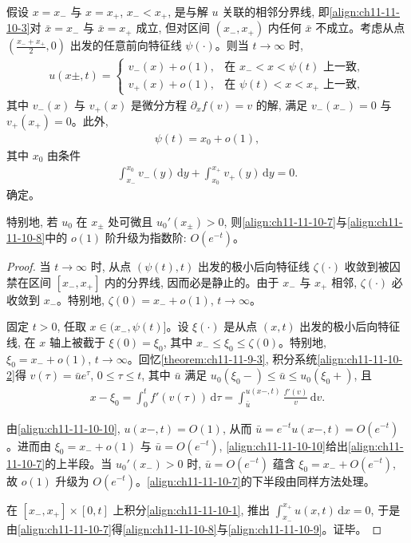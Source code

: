 \documentclass[../../main.tex]{subfiles}
\begin{document}
\begin{lemma}\label{lemma:ch11-11-10-2}
假设 $x=x_-$ 与 $x=x_+$, $x_-<x_+$, 是与解 $u$ 关联的相邻分界线, 即\eqref{align:ch11-11-10-3}对 $\bar x=x_-$ 与 $\bar x=x_+$ 成立, 但对区间 $(x_-,x_+)$ 内任何 $\bar x$ 不成立。考虑从点 $\left(\frac{x_-+x_+}{2},0\right)$ 出发的任意前向特征线 $\psi(\cdot)$。则当 $t\to\infty$ 时,
\begin{align}
u(x\pm,t)=
\begin{cases}
v_-(x)+o(1), & \text{在 }x_-<x<\psi(t)\text{ 上一致},\\
v_+(x)+o(1), & \text{在 }\psi(t)<x<x_+\text{ 上一致},
\end{cases}\label{align:ch11-11-10-7}
\end{align}
其中 $v_-(x)$ 与 $v_+(x)$ 是微分方程 $\partial_x f(v)=v$ 的解, 满足 $v_-(x_-)=0$ 与 $v_+(x_+)=0$。此外,
\begin{align}
\psi(t)=x_0+o(1),\label{align:ch11-11-10-8}
\end{align}
其中 $x_0$ 由条件
\begin{align}
\int_{x_-}^{x_0}v_-(y)\,\mathrm{d}y+\int_{x_0}^{x_+}v_+(y)\,\mathrm{d}y=0.\label{align:ch11-11-10-9}
\end{align}
确定。

特别地, 若 $u_0$ 在 $x_\pm$ 处可微且 $u_0'(x_\pm)>0$, 则\eqref{align:ch11-11-10-7}与\eqref{align:ch11-11-10-8}中的 $o(1)$ 阶升级为指数阶: $O(e^{-t})$。
\end{lemma}

\begin{proof}
当 $t\to\infty$ 时, 从点 $(\psi(t),t)$ 出发的极小后向特征线 $\zeta(\cdot)$ 收敛到被囚禁在区间 $[x_-,x_+]$ 内的分界线, 因而必是静止的。由于 $x_-$ 与 $x_+$ 相邻, $\zeta(\cdot)$ 必收敛到 $x_-$。特别地, $\zeta(0)=x_-+o(1)$, $t\to\infty$。

固定 $t>0$, 任取 $x\in(x_-,\psi(t)]$。设 $\xi(\cdot)$ 是从点 $(x,t)$ 出发的极小后向特征线, 在 $x$ 轴上被截于 $\xi(0)=\xi_0$, 其中 $x_-\leqslant\xi_0\leqslant\zeta(0)$。特别地, $\xi_0=x_-+o(1)$, $t\to\infty$。回忆\cref{theorem:ch11-11-9-3}, 积分系统\eqref{align:ch11-11-10-2}得 $v(\tau)=\bar u e^\tau$, $0\leqslant\tau\leqslant t$, 其中 $\bar u$ 满足 $u_0(\xi_0-)\leqslant\bar u\leqslant u_0(\xi_0+)$, 且
\begin{align}
x-\xi_0=\int_0^t f'(v(\tau))\,\mathrm{d}\tau=\int_{\bar u}^{u(x-,t)}\frac{f'(v)}{v}\,\mathrm{d}v.\label{align:ch11-11-10-10}
\end{align}

由\eqref{align:ch11-11-10-10}, $u(x-,t)=O(1)$, 从而 $\bar u=e^{-t}u(x-,t)=O(e^{-t})$。进而由 $\xi_0=x_-+o(1)$ 与 $\bar u=O(e^{-t})$, \eqref{align:ch11-11-10-10}给出\eqref{align:ch11-11-10-7}的上半段。当 $u_0'(x_-)>0$ 时, $\bar u=O(e^{-t})$ 蕴含 $\xi_0=x_-+O(e^{-t})$, 故 $o(1)$ 升级为 $O(e^{-t})$。\eqref{align:ch11-11-10-7}的下半段由同样方法处理。

在 $[x_-,x_+]\times[0,t]$ 上积分\eqref{align:ch11-11-10-1}, 推出 $\displaystyle\int_{x_-}^{x_+}u(x,t)\,\mathrm{d}x=0$, 于是由\eqref{align:ch11-11-10-7}得\eqref{align:ch11-11-10-8}与\eqref{align:ch11-11-10-9}。证毕。
\end{proof}
\end{document}
